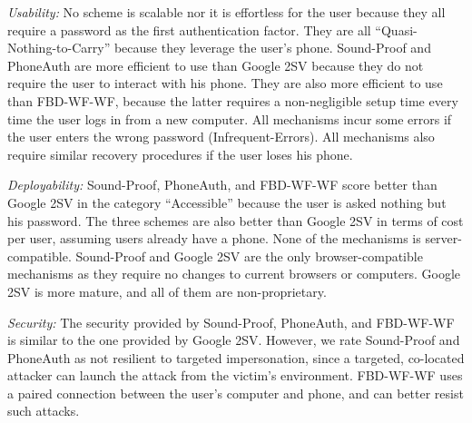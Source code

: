 \emph{Usability:}
No scheme is scalable nor it is effortless for the user because they all require a password as the first authentication factor.
They are all ``Quasi-Nothing-to-Carry'' because they leverage the user's phone.
Sound-Proof and PhoneAuth are more efficient to use than Google 2SV because they do not require the user to interact with his phone. They are also more efficient to use than  FBD-WF-WF, because the latter requires a non-negligible setup time every time the user logs in from a new computer.
All mechanisms incur some errors if the user enters the wrong password (Infrequent-Errors).
All mechanisms also require similar recovery procedures if the user loses his phone.

\emph{Deployability:}
Sound-Proof, PhoneAuth, and FBD-WF-WF score better than Google 2SV in the category ``Accessible'' because the user is asked nothing but his password.
The three schemes are also better than Google 2SV in terms of cost per user, assuming users already have a phone.
None of the mechanisms is server-compatible. Sound-Proof and Google 2SV are the only  browser-compatible mechanisms as they require no changes to current browsers or computers.
Google 2SV is more mature, and all of them are non-proprietary.

\emph{Security:}
The security provided by Sound-Proof, PhoneAuth, and FBD-WF-WF is similar to the one provided by Google 2SV.
However, we rate Sound-Proof and PhoneAuth as not resilient to targeted impersonation, since a targeted, co-located attacker can launch the attack from the victim's environment. FBD-WF-WF uses a paired connection between the user's computer and phone, and can better resist such attacks.

